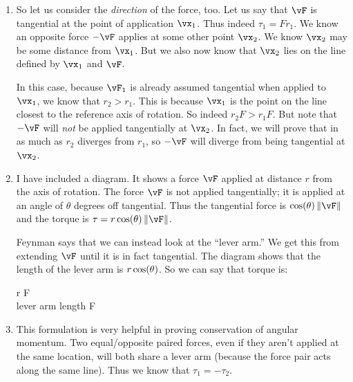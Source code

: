 \begin{enumerate}
  \item So let us consider the \emph{direction} of the force, too. Let
  us say that $\vF$ is tangential at the point of application $\vx_1$.
  Thus indeed $\tau_1 = F r_1$. We know an opposite force $-\vF$ applies
  at some other point $\vx_2$. We know $\vx_2$ may be some distance from
  $\vx_1$. But we also now know that $\vx_2$ lies on the line defined by
  $\vx_1$ and $\vF$.

  In this case, because $\vF_1$ is already assumed tangential when
  applied to $\vx_1$, we know that $r_2 > r_1$. This is because $\vx_1$
  is the point on the line closest to the reference axis of rotation. So
  indeed $r_2 F > r_1 F$. But note that $-\vF$ will \emph{not} be
  applied tangentially at $\vx_2$. In fact, we will prove that in as
  much as $r_2$ diverges from $r_1$, so $-\vF$ will diverge from
  being tangential at $\vx_2$.

  \item I have included a diagram. It shows a force $\vF$ applied at
  distance $r$ from the axis of rotation. The force $\vF$ is not applied
  tangentially; it is applied at an angle of $\theta$ degrees off
  tangential. Thus the tangential force is $\cosf{\theta} \norm{\vF}$
  and the torque is $\tau = r \cosf{\theta} \norm{\vF}$.

  Feynman says that we can instead look at the ``lever arm.'' We get
  this from extending $\vF$ until it is in fact tangential. The diagram
  shows that the length of the lever arm is $r \cos\mathopen{}\left( {\theta} \right)\mathclose{}$. So we can
  say that torque is:

  \begin{nedqn}
    \tau
  \eqcol
    r \cosf{\theta} F
  \\
  \eqcol
    \textrm{lever arm length} \cdot F
  \end{nedqn}

  \item This formulation is very helpful in proving conservation of
  angular momentum. Two equal/opposite paired forces, even if they
  aren't applied at the same location, will both share a lever arm
  (because the force pair acts along the same line). Thus we know that
  $\tau_1 = -\tau_2$.
\end{enumerate}

